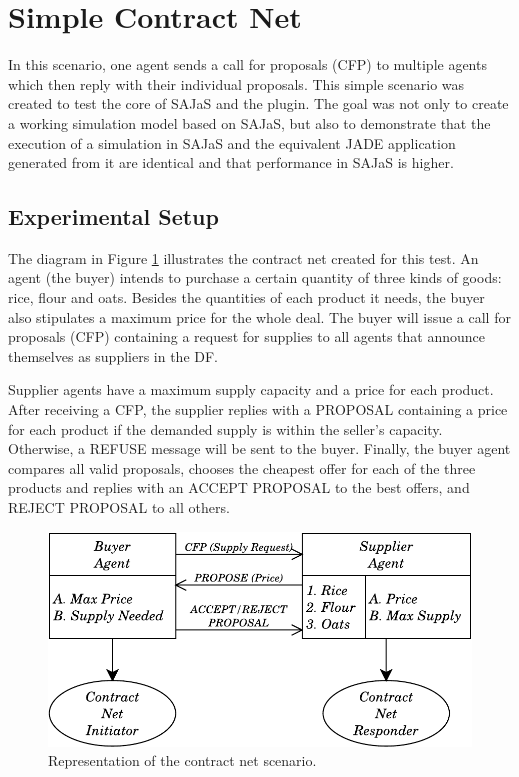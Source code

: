 \section{Simple Contract Net}

In this scenario, one agent sends a call for proposals (CFP) to multiple agents which then reply with their individual proposals. This simple scenario was created to test the core of SAJaS and the plugin. The goal was not only to create a working simulation model based on SAJaS, but also to demonstrate that the execution of a simulation in SAJaS and the equivalent JADE application generated from it are identical and that performance in SAJaS is higher.

\subsection{Experimental Setup}

The diagram in Figure \ref{fig:CNetExample} illustrates the contract net created for this test. An agent (the buyer) intends to purchase a certain quantity of three kinds of goods: rice, flour and oats. Besides the quantities of each product it needs, the buyer also stipulates a maximum price for the whole deal. The buyer will issue a call for proposals (CFP) containing a request for supplies to all agents that announce themselves as suppliers in the DF.

Supplier agents have a maximum supply capacity and a price for each product. After receiving a CFP, the supplier replies with a PROPOSAL containing a price for each product if the demanded supply is within the seller's capacity. Otherwise, a REFUSE message will be sent to the buyer.
Finally, the buyer agent compares all valid proposals, chooses the cheapest offer for each of the three products and replies with an ACCEPT PROPOSAL to the best offers, and REJECT PROPOSAL to all others.

\begin{figure}[h]
	\centering
	\includegraphics[width=0.60\linewidth]{figures/CNetExample.pdf}
	\caption{Representation of the contract net scenario.}
	\label{fig:CNetExample}
\end{figure}

